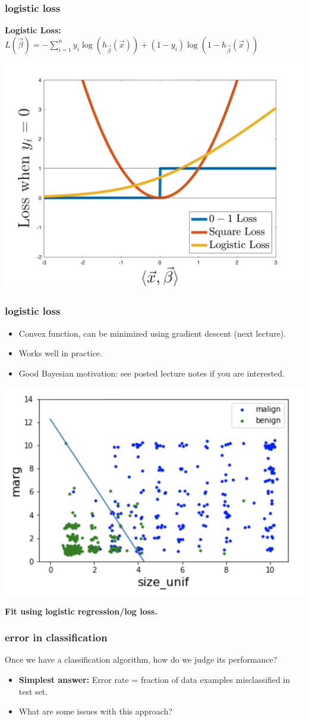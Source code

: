 \documentclass[handout,compress]{beamer}
\begin{document}
\begin{frame}
	\frametitle{logistic loss}
	\textbf{Logistic Loss:} $L(\vec{\beta}) = - \sum_{i=1}^n y_i \log(h_{\vec{\beta}}(\vec{x})) + (1-y_i) \log(1 - h_{\vec{\beta}}(\vec{x})) $
	\vspace{-.5em}
	\begin{center}
		\includegraphics[width=.6\textwidth]{all_loss.png}
	\end{center}

\end{frame}

\begin{frame}
	\frametitle{logistic loss}
	\begin{itemize}
		\item Convex function, can be minimized using gradient descent (next lecture).
		\item Works well in practice.
		\item Good Bayesian motivation: see posted lecture notes if you are interested.
	\end{itemize}
\begin{center}
	\includegraphics[width=.5\textwidth]{logisticloss.png}
	
	\textbf{Fit using logistic regression/log loss.}
\end{center}
\end{frame}

\begin{frame}
	\frametitle{error in classification}
	Once we have a classification algorithm, how do we judge its performance?
	\begin{itemize}
		\item \textbf{Simplest answer:} Error rate = fraction of data examples misclassified in test set.
		\item What are some issues with this approach?
	\end{itemize}
\end{frame}
\end{document}
